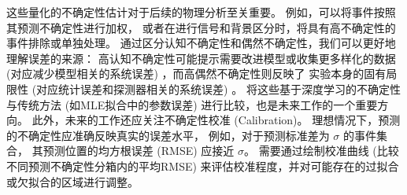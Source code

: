 这些量化的不确定性估计对于后续的物理分析至关重要。
例如，可以将事件按照其预测不确定性进行加权，
或者在进行信号和背景区分时，将具有高不确定性的事件排除或单独处理。
通过区分认知不确定性和偶然不确定性，我们可以更好地理解误差的来源：
高认知不确定性可能提示需要改进模型或收集更多样化的数据 
(对应减少模型相关的系统误差) ，而高偶然不确定性则反映了
实验本身的固有局限性 (对应统计误差和探测器相关的系统误差) 。
将这些基于深度学习的不确定性与传统方法 
(如MLE拟合中的参数误差) 进行比较，也是未来工作的一个重要方向。
此外，未来的工作还应关注不确定性校准 (Calibration)。
理想情况下，预测的不确定性应准确反映真实的误差水平，
例如，对于预测标准差为 $\sigma$ 的事件集合，
其预测位置的均方根误差 (RMSE) 应接近 $\sigma$。
需要通过绘制校准曲线 (比较不同预测不确定性分箱内的平均RMSE) 
来评估校准程度，并对可能存在的过拟合或欠拟合的区域进行调整。

